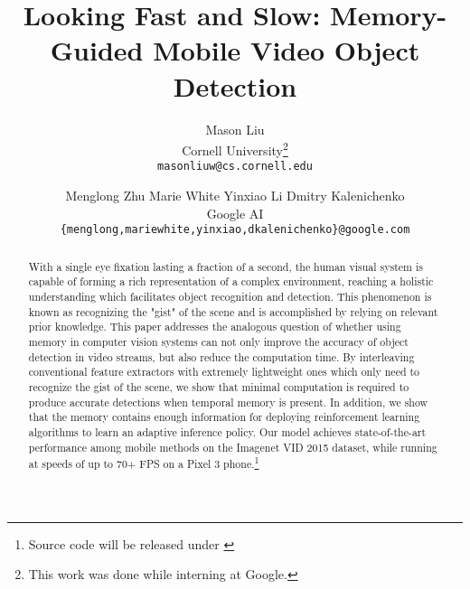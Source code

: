 \documentclass[10pt,twocolumn,letterpaper]{article}
\begin{document}
\title{Looking Fast and Slow: Memory-Guided Mobile Video Object Detection}

\author{Mason Liu\\
Cornell University\thanks{This work was done while interning at Google.} \\
\texttt{\small masonliuw{@}cs.cornell.edu}\\
\and Menglong Zhu \enskip Marie White \enskip Yinxiao Li \enskip Dmitry Kalenichenko \\
Google AI\\
\texttt{\small \{menglong,mariewhite,yinxiao,dkalenichenko\}{@}google.com}\\
}

\maketitle
\thispagestyle{empty}

\begin{abstract}
With a single eye fixation lasting a fraction of a second, the human visual system is capable of forming a rich representation of a complex environment, reaching a holistic understanding which facilitates object recognition and detection. This phenomenon is known as recognizing the "gist" of the scene and is accomplished by relying on relevant prior knowledge. This paper addresses the analogous question of whether using memory in computer vision systems can not only improve the accuracy of object detection in video streams, but also reduce the computation time. By interleaving conventional feature extractors with extremely lightweight ones which only need to recognize the gist of the scene, we show that minimal computation is required to produce accurate detections when temporal memory is present. In addition, we show that the memory contains enough information for deploying reinforcement learning algorithms to learn an adaptive inference policy. Our model achieves state-of-the-art performance among mobile methods on the Imagenet VID 2015 dataset, while running at speeds of up to 70+ FPS on a Pixel 3 phone.\footnote{Source code will be released under \cite{mobilelstd}}
\end{abstract}
\end{document}
